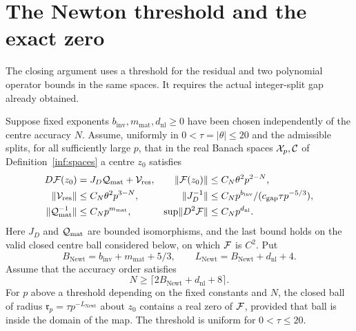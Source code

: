 \section{The Newton threshold and the exact zero}\label{inf:sec-newton}

The closing argument uses a threshold for the residual and two
polynomial operator bounds in the same spaces. It requires the
actual integer-split gap already obtained.

\begin{theorem}\label{inf:newton-threshold}
Suppose fixed exponents $b_{\mathrm{inv}},m_{\mathrm{mat}},d_{\mathrm{nl}}\ge0$ have been chosen independently
of the centre accuracy $N$. Assume, uniformly in $0<\tau=|\theta|\le20$
and the admissible splits, for all sufficiently large $p$, that
in the real Banach spaces $\mathcal X_p,\mathcal C$ of
Definition~\ref{inf:spaces} a centre $z_0$ satisfies
\begin{align*}
 D\mathcal F(z_0)&=J_D\mathcal Q_{\mathrm{mat}}+\mathcal V_{\mathrm{res}},&
 \lVert \mathcal F(z_0)\rVert&\le C_N\theta^2p^{2-N},\\
 \lVert \mathcal V_{\mathrm{res}}\rVert&\le C_N\theta^2p^{3-N},&
 \lVert J_D^{-1}\rVert&\le C_Np^{b_{\mathrm{inv}}}/(c_{\mathrm{gap}}\tau p^{-5/3}),\\
 \lVert \mathcal Q_{\mathrm{mat}}^{-1}\rVert&\le C_Np^{m_{\mathrm{mat}}},&
 \sup\lVert D^2\mathcal F\rVert&\le C_Np^{d_{\mathrm{nl}}}.
\end{align*}
Here $J_D$ and $\mathcal Q_{\mathrm{mat}}$ are bounded isomorphisms, and the last bound
holds on the valid closed centre ball considered below, on which
$\mathcal F$ is $C^2$.
Put
\begin{equation}\label{inf:threshold-exponents}
 B_{\mathrm{Newt}}=b_{\mathrm{inv}}+m_{\mathrm{mat}}+5/3,\qquad
 L_{\mathrm{Newt}}=B_{\mathrm{Newt}}+d_{\mathrm{nl}}+4.
\end{equation}
Assume that the accuracy order satisfies
\begin{equation}\label{inf:threshold-accuracy}
 N\ge\lceil2B_{\mathrm{Newt}}+d_{\mathrm{nl}}+8\rceil.
\end{equation}
For $p$ above a threshold depending on the fixed constants and
$N$, the closed ball of radius
$\mathfrak r_p=\tau p^{-L_{\mathrm{Newt}}}$ about $z_0$ contains a
real zero of $\mathcal F$, provided that ball is inside the domain of the
map. The threshold is uniform for $0<\tau\le20$.
\end{theorem}

